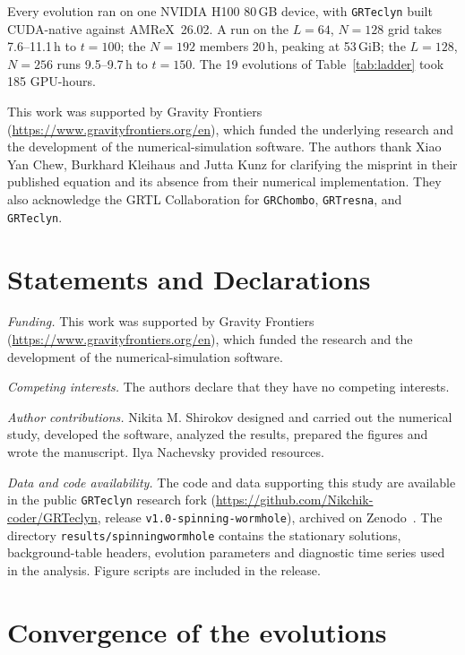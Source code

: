 \documentclass[twocolumn,floatfix,aps,prd,superscriptaddress,nofootinbib]{revtex4-2}
\begin{document}
Every evolution ran on one NVIDIA H100 80\,GB device, with \texttt{GRTeclyn} built CUDA-native against AMReX~26.02. A run on the $L=64$, $N=128$ grid takes 7.6--11.1\,h to $t=100$; the $N=192$ members 20\,h, peaking at 53\,GiB; the $L=128$, $N=256$ runs 9.5--9.7\,h to $t=150$. The 19 evolutions of Table~\ref{tab:ladder} took 185 GPU-hours.

\begin{acknowledgments}
This work was supported by Gravity Frontiers
(\url{https://www.gravityfrontiers.org/en}), which funded the underlying
research and the development of the numerical-simulation software. The authors
thank Xiao Yan Chew, Burkhard Kleihaus and Jutta Kunz for clarifying the misprint in their published equation and its absence from their numerical implementation. They also acknowledge the GRTL Collaboration for \texttt{GRChombo}, \texttt{GRTresna},
and \texttt{GRTeclyn}.
\end{acknowledgments}

\section*{Statements and Declarations}

\noindent\textit{Funding.} This work was supported by Gravity Frontiers (\url{https://www.gravityfrontiers.org/en}), which funded the research and the development of the numerical-simulation software.

\noindent\textit{Competing interests.} The authors declare that they have no competing interests.

\noindent\textit{Author contributions.} Nikita M. Shirokov designed and carried out the numerical study, developed the software, analyzed the results, prepared the figures and wrote the manuscript. Ilya Nachevsky provided resources.

\noindent\textit{Data and code availability.} The code and data supporting this study are available in the public \texttt{GRTeclyn} research fork (\url{https://github.com/Nikchik-coder/GRTeclyn}, release \texttt{v1.0-spinning-wormhole}), archived on Zenodo~\cite{shirokov2026code}. The directory \texttt{results/spinningwormhole} contains the stationary solutions, background-table headers, evolution parameters and diagnostic time series used in the analysis. Figure scripts are included in the release.

\appendix

\section{Convergence of the evolutions}
\label{app:conv}
\end{document}
